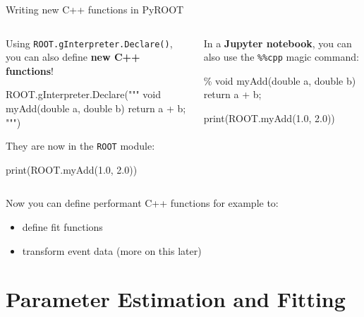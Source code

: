 \documentclass[aspectratio=169]{beamer}
\begin{document}
\begin{frame}[fragile]{Writing new C++ functions in PyROOT}
\begin{columns}
    \begin{column}{0.5\textwidth}
        Using \texttt{ROOT.gInterpreter.Declare()}, you can also define \textbf{new C++ functions}!
        \begin{pycell}
ROOT.gInterpreter.Declare("""
void myAdd(double a, double b) {
    return a + b;
}
""")
        \end{pycell}
        They are now in the \texttt{ROOT} module:
        \begin{pycell}
print(ROOT.myAdd(1.0, 2.0))
        \end{pycell}
    \end{column}
    \begin{column}{0.5\textwidth}
        In a \textbf{Jupyter notebook}, you can also use the \texttt{\%\%cpp} magic command:
        \begin{cppcell}
\%%
void myAdd(double a, double b) {
    return a + b;
}
        \end{cppcell}
        \begin{pycell}
print(ROOT.myAdd(1.0, 2.0))
        \end{pycell}
    \end{column}
\end{columns}

    \vspace{4mm}
Now you can define performant C++ functions for example to:

\begin{itemize}
    \item define fit functions
    \item transform event data (more on this later)
\end{itemize}

\end{frame}


\section{Parameter Estimation and Fitting}
\end{document}
